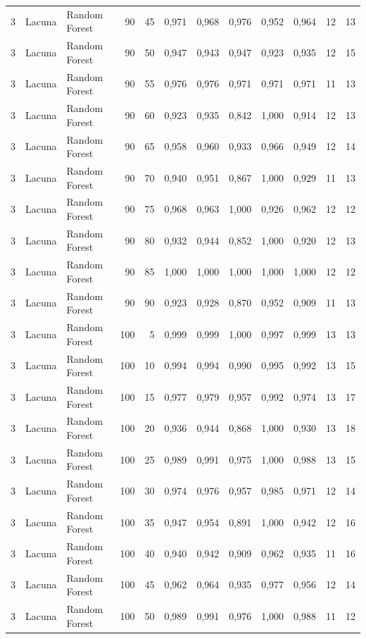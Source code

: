 \begin{longtable}{@{}rllrrrrrrrrr@{}}
3 & Lacuna & Random Forest & 90 & 45 & 0,971 & 0,968 & 0,976 & 0,952 & 0,964 & 12 & 13 \\
3 & Lacuna & Random Forest & 90 & 50 & 0,947 & 0,943 & 0,947 & 0,923 & 0,935 & 12 & 15 \\
3 & Lacuna & Random Forest & 90 & 55 & 0,976 & 0,976 & 0,971 & 0,971 & 0,971 & 11 & 13 \\
3 & Lacuna & Random Forest & 90 & 60 & 0,923 & 0,935 & 0,842 & 1,000 & 0,914 & 12 & 13 \\
3 & Lacuna & Random Forest & 90 & 65 & 0,958 & 0,960 & 0,933 & 0,966 & 0,949 & 12 & 14 \\
3 & Lacuna & Random Forest & 90 & 70 & 0,940 & 0,951 & 0,867 & 1,000 & 0,929 & 11 & 13 \\
3 & Lacuna & Random Forest & 90 & 75 & 0,968 & 0,963 & 1,000 & 0,926 & 0,962 & 12 & 12 \\
3 & Lacuna & Random Forest & 90 & 80 & 0,932 & 0,944 & 0,852 & 1,000 & 0,920 & 12 & 13 \\
3 & Lacuna & Random Forest & 90 & 85 & 1,000 & 1,000 & 1,000 & 1,000 & 1,000 & 12 & 12 \\
3 & Lacuna & Random Forest & 90 & 90 & 0,923 & 0,928 & 0,870 & 0,952 & 0,909 & 11 & 13 \\
3 & Lacuna & Random Forest & 100 & 5 & 0,999 & 0,999 & 1,000 & 0,997 & 0,999 & 13 & 13 \\
3 & Lacuna & Random Forest & 100 & 10 & 0,994 & 0,994 & 0,990 & 0,995 & 0,992 & 13 & 15 \\
3 & Lacuna & Random Forest & 100 & 15 & 0,977 & 0,979 & 0,957 & 0,992 & 0,974 & 13 & 17 \\
3 & Lacuna & Random Forest & 100 & 20 & 0,936 & 0,944 & 0,868 & 1,000 & 0,930 & 13 & 18 \\
3 & Lacuna & Random Forest & 100 & 25 & 0,989 & 0,991 & 0,975 & 1,000 & 0,988 & 13 & 15 \\
3 & Lacuna & Random Forest & 100 & 30 & 0,974 & 0,976 & 0,957 & 0,985 & 0,971 & 12 & 14 \\
3 & Lacuna & Random Forest & 100 & 35 & 0,947 & 0,954 & 0,891 & 1,000 & 0,942 & 12 & 16 \\
3 & Lacuna & Random Forest & 100 & 40 & 0,940 & 0,942 & 0,909 & 0,962 & 0,935 & 11 & 16 \\
3 & Lacuna & Random Forest & 100 & 45 & 0,962 & 0,964 & 0,935 & 0,977 & 0,956 & 12 & 14 \\
3 & Lacuna & Random Forest & 100 & 50 & 0,989 & 0,991 & 0,976 & 1,000 & 0,988 & 11 & 12 \\

\end{longtable}
